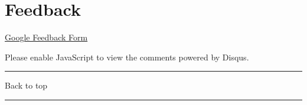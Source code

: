 \documentclass[
]{article}
\renewcommand{\linethickness}{0.05em}
\begin{document}
\pagebreak

\hypertarget{feedback}{%
\section{Feedback}\label{feedback}}

\href{https://docs.google.com/forms/d/e/1FAIpQLSeD3Z9J6Y7eMmiyM12f_SfAmHUlykb1zxZcwO6lg7cebGYQIQ/viewform}{Google
Feedback Form}

\hypertarget{disqus_thread}{}

Please enable JavaScript to view the comments powered by Disqus.

\begin{center}\rule{0.5\linewidth}{\linethickness}\end{center}

Back to top

\begin{center}\rule{0.5\linewidth}{\linethickness}\end{center}

\pagebreak
\end{document}
